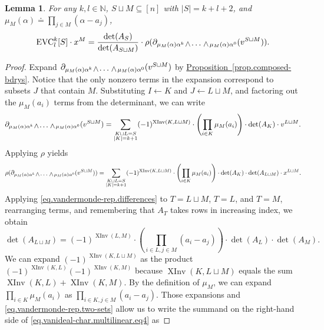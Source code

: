 \documentclass[11pt]{article}
\numberwithin{equation}{section}
\newtheorem{lemma}[theorem]{Lemma}
\theoremstyle{definition}
\theoremstyle{plain}
\newcommand{\N}{\mathbb N}
\newcommand{\expref}[2]{\hyperref[#2]{#1~\ref{#2}}}
\newcommand{\wedgec}{\raisebox{-0.1pt}{\hskip 1pt{\tiny $\wedge$}\hskip 1pt}}
\newcommand{\wcdots}{\raisebox{-1pt}{$\cdots$}}
\newcommand{\wedgecdots}{\wedgec\wcdots\wedgec}
\newcommand{\bdry}{\partial}
\newcommand{\VanGen}{{\ensuremath{\mathrm{EVC}}}}
\newcommand{\VanGenparam}[2]{{\ensuremath{\VanGen^{#1}_{#2}}}}
\newcommand{\VanGenkl}{\VanGenparam{k}{l}}
\newcommand{\Srepr}{\rho}
\newcommand{\Amat}[1]{A_{#1}}
\newcommand{\Adet}[1]{\det(\Amat{#1})}
\DeclareMathOperator{\XInv}{XInv}
\begin{document}
\begin{lemma}
  \label{lem.simplicial-vangen-high-degree}
  For any \(k,l \in \N\), \(S\sqcup M \subseteq [n]\) with $|S|=k+l+2$, and $\mu_M(\alpha) \doteq \prod_{j \in M}(\alpha - a_j)$, 
  \begin{equation} \label{eq.simplicial-vangen-high-degree}
    \VanGenkl[S]\cdot x^M = 
    \frac{\Adet{S}}{\Adet{S \sqcup M}} \cdot \Srepr(\bdry_{\mu_M(\alpha)\alpha^k\wedgecdots \mu_M(\alpha)\alpha^0}(v^{S \sqcup M})).
  \end{equation}
\end{lemma}

\begin{proof}
Expand $\bdry_{\mu_M(\alpha)\alpha^k\wedgecdots \mu_M(\alpha)\alpha^0} (v^{S \sqcup M})$ by \expref{Proposition}{prop.composed-bdrys}. Notice that the only nonzero terms in the expansion correspond to subsets $J$ that contain $M$. Substituting $I \gets K$ and $J \gets L \sqcup M$, and factoring out the $\mu_M(a_i)$ terms from the determinant, we can write
%
\[ \bdry_{\mu_M(\alpha)\alpha^k\wedgecdots \mu_M(\alpha)\alpha^0}(v^{S \sqcup M}) = 
\sum_{\substack{K\sqcup L=S\\ |K|=k+1}} (-1)^{\XInv(K,L\sqcup M)} \cdot \left(\prod_{i\in K} \mu_M(a_{i})\right) \cdot \Adet{K} \cdot v^{L \sqcup M}. 
\]
Applying $\Srepr$ yields
\begin{equation}\label{eq.vanideal-char.multilinear.eq4}
\Srepr(\bdry_{\mu_M(\alpha)\alpha^k\wedgecdots \mu_M(\alpha)\alpha^0}(v^{S \sqcup M})) = 
\sum_{\substack{K\sqcup L=S\\ |K|=k+1}} (-1)^{\XInv(K,L\sqcup M)} \cdot \left(\prod_{i\in K} \mu_M(a_{i})\right) 
    \cdot \Adet{K} \cdot \Adet{L \sqcup M} \cdot x^{L \sqcup M}. 
\end{equation}
Applying \eqref{eq.vandermonde-rep.differences} to $T=L \sqcup M$, $T=L$, and $T=M$, rearranging terms, and remembering that $A_T$ takes rows in increasing index, we obtain
\begin{equation}
\label{eq.vandermonde-rep.two-sets}
\Adet{L \sqcup M} = (-1)^{\XInv(L,M)}\cdot \left( \prod_{i\in L,j\in M} (a_{i}-a_{j})\right) \cdot \Adet{L} \cdot \Adet{M}.
\end{equation}
We can expand $(-1)^{\XInv(K,L\sqcup M)}$ as the product $(-1)^{\XInv(K,L)} (-1)^{\XInv(K,M)}$ because
$\XInv(K,L \sqcup M)$ equals the sum $\XInv(K,L)+\XInv(K,M)$.
By the definition of $\mu_M$, we can expand $\prod_{i \in K} \mu_M(a_i)$ as $\prod_{i\in K, j \in M} (a_i-a_j)$. Those expansions and \eqref{eq.vandermonde-rep.two-sets} allow us to write the summand on the right-hand side of \eqref{eq.vanideal-char.multilinear.eq4} as

\end{proof}
\end{document}
